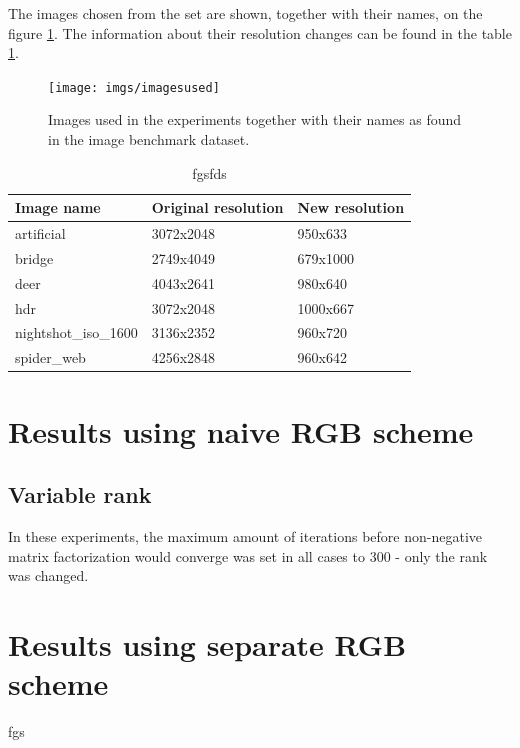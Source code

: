 \documentclass[thesis=M,english]{FITthesis}[2012/10/20]
\begin{document}
The images chosen from the set are shown, together with their names, on the
figure \ref{fig:benchmarkimages}. The information about their resolution changes
can be found in the table \ref{tab:benchmarkimagesresolutions}.

\begin{figure}[h]
  \centering
  \texttt{[image: imgs/imagesused]}
  \caption{Images used in the experiments together with their names as found in the
           image benchmark dataset.}
  \label{fig:benchmarkimages}
\end{figure}

\begin{table}[h]
\centering
\begin{tabular}{|l|l|l|}
\hline
\textbf{Image name}  & \textbf{Original resolution} & \textbf{New resolution} \\ \hline
artificial           & 3072x2048                    & 950x633                     \\ \hline
bridge               & 2749x4049                    & 679x1000                     \\ \hline
deer                 & 4043x2641                    & 980x640                     \\ \hline
hdr                  & 3072x2048                    & 1000x667                     \\ \hline
nightshot\_iso\_1600 & 3136x2352                    & 960x720                     \\ \hline
spider\_web          & 4256x2848                    & 960x642                     \\ \hline
\end{tabular}
\caption{fgsfds}
\label{tab:benchmarkimagesresolutions}
\end{table}


\section{Results using naive RGB scheme}
\subsection{Variable rank}
In these experiments, the maximum amount of iterations before non-negative matrix
factorization would converge was set in all cases to 300 - only the rank was changed.
 

\section{Results using separate RGB scheme}
fgs
\end{document}
